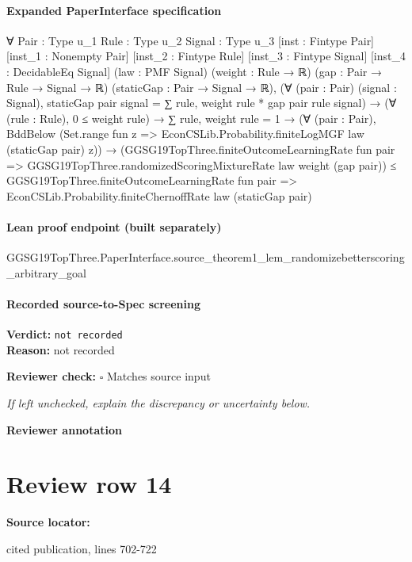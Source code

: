 \documentclass[10pt]{article}
\newcommand{\reviewerbox}{%
  \par\noindent\fbox{\parbox{0.96\linewidth}{\rule{0pt}{0.38in}}}\par
}
\newcommand{\reviewmatch}[1]{%
  \par\noindent\textbf{Reviewer check:} $\square$\; #1\par
  \noindent\emph{If left unchecked, explain the discrepancy or uncertainty below.}\par
}
\begin{document}
\paragraph{Expanded PaperInterface specification}
\begin{ReviewVerbatim}
∀ {Pair : Type u_1} {Rule : Type u_2} {Signal : Type u_3} [inst : Fintype Pair] [inst_1 : Nonempty Pair]
  [inst_2 : Fintype Rule] [inst_3 : Fintype Signal] [inst_4 : DecidableEq Signal] (law : PMF Signal) (weight : Rule → ℝ)
  (gap : Pair → Rule → Signal → ℝ) (staticGap : Pair → Signal → ℝ),
  (∀ (pair : Pair) (signal : Signal), staticGap pair signal = ∑ rule, weight rule * gap pair rule signal) →
    (∀ (rule : Rule), 0 ≤ weight rule) →
      ∑ rule, weight rule = 1 →
        (∀ (pair : Pair), BddBelow (Set.range fun z => EconCSLib.Probability.finiteLogMGF law (staticGap pair) z)) →
          (GGSG19TopThree.finiteOutcomeLearningRate fun pair =>
              GGSG19TopThree.randomizedScoringMixtureRate law weight (gap pair)) ≤
            GGSG19TopThree.finiteOutcomeLearningRate fun pair =>
              EconCSLib.Probability.finiteChernoffRate law (staticGap pair)
\end{ReviewVerbatim}

\paragraph{Lean proof endpoint (built separately)}\begin{ReviewVerbatim}
GGSG19TopThree.PaperInterface.source_theorem1_lem_randomizebetterscoring_arbitrary_goal
\end{ReviewVerbatim}

\paragraph{Recorded source-to-Spec screening}
\textbf{Verdict:} \texttt{not recorded}
\\
\textbf{Reason:} not recorded
\reviewmatch{Matches source input}
\noindent\textbf{Reviewer annotation}\par
\reviewerbox
\clearpage
\hypertarget{source-claim-82eaa4a544e4300f}{}
\section*{Review row 14}
\textbf{Source locator:} {\footnotesize\raggedright cited publication, lines 702-\allowbreak{}722\par}
\end{document}
